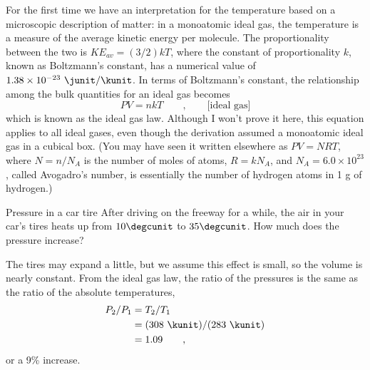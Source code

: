 For the first time we have an interpretation for the
temperature based on a microscopic description of matter: in
a monoatomic ideal gas, the temperature is a measure of the
average kinetic energy per molecule. The proportionality
between the two is $KE_{av}=(3/2)kT$, where the constant of
proportionality $k$, known as Boltzmann's constant, has a
numerical value of $1.38\times10^{-23}\ \junit/\kunit$. In terms of
Boltzmann's constant, the relationship among the bulk
quantities for an ideal gas becomes
\begin{equation*}
        PV        =  nkT \qquad , \qquad \text{[ideal gas]}
\end{equation*}
which is known as the ideal gas law. 
Although I won't prove it here, this equation applies to all ideal gases, even
though the derivation assumed a monoatomic ideal gas in a cubical box.
 (You may have seen it
written elsewhere as $PV=NRT$, where $N=n/N_A$ is the number of
moles of atoms, $R=kN_A$, and $N_A=6.0\times10^{23}$, called
Avogadro's number, is essentially the number of hydrogen
atoms in 1 g of hydrogen.)

\begin{eg}{Pressure in a car tire}
\egquestion
After driving on the freeway for a while, the air
in your car's tires heats up from $10\degcunit$ to $35\degcunit$. How much
does the pressure increase?

\eganswer
The tires may expand a little, but we assume this
effect is small, so the volume is nearly constant. From the
ideal gas law, the ratio of the pressures is the same as the
ratio of the absolute temperatures,
\begin{align*}
          P_2/ P_1
                &= T_2/ T_1\\
                &=(308\ \kunit)/(283\ \kunit)\\
                &= 1.09 \qquad ,\\
\end{align*}
or a 9\% increase.
\end{eg}

